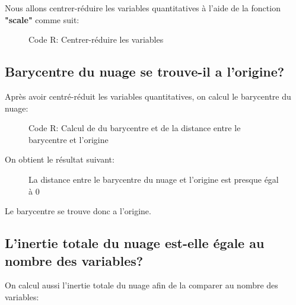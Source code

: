 Nous allons centrer-réduire les variables quantitatives à l'aide de la fonction \textbf{"scale"} comme suit:

\begin{figure}[h]
\centering
{}
\caption{Code R: Centrer-réduire les variables}
\end{figure}

\subsection{Barycentre du nuage se trouve-il a l'origine?}

Après avoir centré-réduit les variables quantitatives, on calcul le barycentre du nuage:

\begin{figure}[h]
\centering
{}
\caption{Code R: Calcul de du barycentre et de la distance entre le barycentre et l'origine}
\end{figure}

On obtient le résultat suivant:

\begin{figure}[h]
\centering
{}
\caption{La distance entre le barycentre du nuage et l'origine est presque égal à 0}
\end{figure}

Le barycentre se trouve donc a l’origine.

\subsection{L'inertie totale du nuage est-elle égale au nombre des variables?}

On calcul aussi l’inertie totale du nuage afin de la comparer au nombre des variables:

